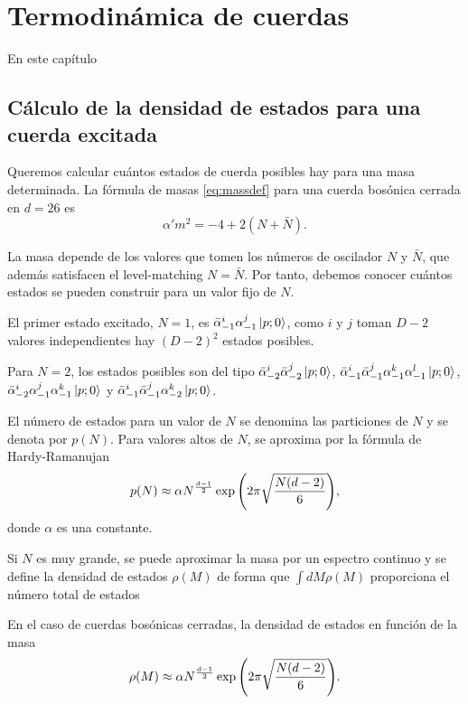 \chapter{Termodinámica de cuerdas}

En este capítulo

\section{Cálculo de la densidad de estados para una cuerda excitada}

Queremos calcular cuántos estados de cuerda posibles hay para una masa determinada.
La fórmula de masas \ref{eq:massdef} para una cuerda bosónica cerrada en $d=26$ es
\begin{equation}
  \alpha' m^2=-4+2(N+\bar N).
\end{equation}

La masa depende de los valores que tomen los números de oscilador $N$ y $\bar N$, que además
satisfacen el level-matching $N=\bar N$.
Por tanto, debemos conocer cuántos estados se pueden construir para un valor fijo de $N$.

El primer estado excitado, $N=1$, es $\bar \alpha^i_{-1} \alpha^j_{-1} \ket{p;0}$, como 
$i$ y $j$ toman $D-2$ valores independientes hay $(D-2)^2$ estados posibles.

Para $N=2$, los estados posibles son del tipo $\bar \alpha^i_{-2}\bar \alpha^j_{-2}\ket{p;0}$, 
$\bar \alpha^i_{-1} \bar \alpha^j_{-1} \alpha^k_{-1} \alpha^l_{-1} \ket{p;0}$,
$\bar \alpha^i_{-2} \alpha^j_{-1} \alpha^k_{-1}\ket{p;0}$ y $\bar \alpha^i_{-1} \bar \alpha^j_{-1} \alpha^k_{-2} \ket{p;0}$.


El número de estados para un valor de $N$ se denomina las particiones de $N$ y se denota por $p(N)$.
Para valores altos de $N$, se aproxima por la fórmula de Hardy-Ramanujan
\begin{equation}
  p(N)\approx \alpha N^ {\frac{d-1}{2}}\exp\qty(2\pi\sqrt{\frac{N(d-2)}{6}}),
\end{equation}
donde $\alpha$ es una constante.

Si $N$ es muy grande, se puede aproximar la masa por un espectro continuo y se define la
densidad de estados $\rho(M)$ de forma que $\int dM \rho(M)$ proporciona el número total
de estados 

En el caso de cuerdas bosónicas cerradas, la densidad de estados en función de la masa
\begin{equation}
  \rho(M)\approx \alpha N^ {\frac{d-1}{2}}\exp\qty(2\pi\sqrt{\frac{N(d-2)}{6}}).
\end{equation}

